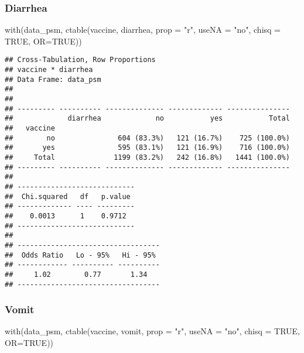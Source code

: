 \documentclass[
]{article}
\newenvironment{Shaded}{\begin{snugshade}}{\end{snugshade}}
\newcommand{\AttributeTok}[1]{\textcolor[rgb]{0.77,0.63,0.00}{#1}}
\newcommand{\ConstantTok}[1]{\textcolor[rgb]{0.00,0.00,0.00}{#1}}
\newcommand{\FunctionTok}[1]{\textcolor[rgb]{0.00,0.00,0.00}{#1}}
\newcommand{\NormalTok}[1]{#1}
\newcommand{\StringTok}[1]{\textcolor[rgb]{0.31,0.60,0.02}{#1}}
\begin{document}
\hypertarget{diarrhea-1}{%
\subsubsection{Diarrhea}\label{diarrhea-1}}

\begin{Shaded}
\begin{Highlighting}[]
\FunctionTok{with}\NormalTok{(data\_psm, }\FunctionTok{ctable}\NormalTok{(vaccine, diarrhea, }\AttributeTok{prop =} \StringTok{"r"}\NormalTok{, }\AttributeTok{useNA =} \StringTok{"no"}\NormalTok{, }\AttributeTok{chisq =} \ConstantTok{TRUE}\NormalTok{, }\AttributeTok{OR=}\ConstantTok{TRUE}\NormalTok{))}
\end{Highlighting}
\end{Shaded}

\begin{verbatim}
## Cross-Tabulation, Row Proportions  
## vaccine * diarrhea  
## Data Frame: data_psm  
## 
## 
## --------- ---------- -------------- ------------- ---------------
##             diarrhea             no           yes           Total
##   vaccine                                                        
##        no               604 (83.3%)   121 (16.7%)    725 (100.0%)
##       yes               595 (83.1%)   121 (16.9%)    716 (100.0%)
##     Total              1199 (83.2%)   242 (16.8%)   1441 (100.0%)
## --------- ---------- -------------- ------------- ---------------
## 
## ----------------------------
##  Chi.squared   df   p.value 
## ------------- ---- ---------
##    0.0013      1    0.9712  
## ----------------------------
## 
## ----------------------------------
##  Odds Ratio   Lo - 95%   Hi - 95% 
## ------------ ---------- ----------
##     1.02        0.77       1.34   
## ----------------------------------
\end{verbatim}

\hypertarget{vomit-1}{%
\subsubsection{Vomit}\label{vomit-1}}

\begin{Shaded}
\begin{Highlighting}[]
\FunctionTok{with}\NormalTok{(data\_psm, }\FunctionTok{ctable}\NormalTok{(vaccine, vomit, }\AttributeTok{prop =} \StringTok{"r"}\NormalTok{, }\AttributeTok{useNA =} \StringTok{"no"}\NormalTok{, }\AttributeTok{chisq =} \ConstantTok{TRUE}\NormalTok{, }\AttributeTok{OR=}\ConstantTok{TRUE}\NormalTok{))}
\end{Highlighting}
\end{Shaded}
\end{document}
